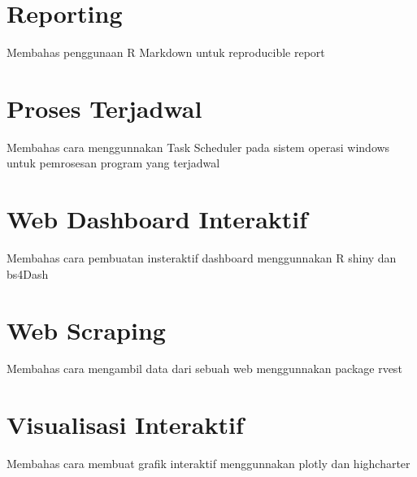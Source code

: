 \documentclass[]{book}
\begin{document}
\hypertarget{reporting}{%
\chapter{Reporting}\label{reporting}}

Membahas penggunaan R Markdown untuk reproducible report

\hypertarget{scheduler}{%
\chapter{Proses Terjadwal}\label{scheduler}}

Membahas cara menggunnakan Task Scheduler pada sistem operasi windows untuk pemrosesan program yang terjadwal

\hypertarget{shiny}{%
\chapter{Web Dashboard Interaktif}\label{shiny}}

Membahas cara pembuatan insteraktif dashboard menggunnakan R shiny dan bs4Dash

\hypertarget{scraping}{%
\chapter{Web Scraping}\label{scraping}}

Membahas cara mengambil data dari sebuah web menggunnakan package rvest

\hypertarget{interactiveviz}{%
\chapter{Visualisasi Interaktif}\label{interactiveviz}}

Membahas cara membuat grafik interaktif menggunnakan plotly dan highcharter


\end{document}
